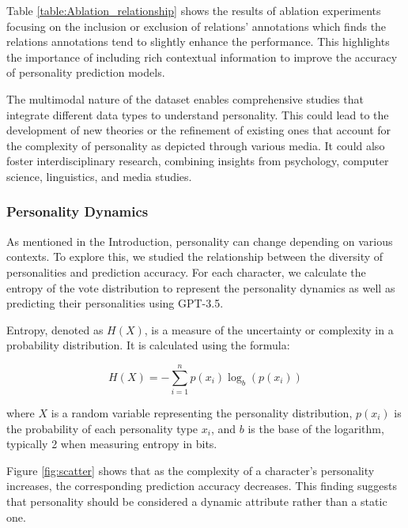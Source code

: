 Table \ref{table:Ablation_relationship} shows the results of ablation experiments focusing on the inclusion or exclusion of relations' annotations which finds the relations annotations tend to slightly enhance the performance. This highlights the importance of including rich contextual information to improve the accuracy of personality prediction models. 


The multimodal nature of the dataset enables comprehensive studies that integrate different data types to understand personality. This could lead to the development of new theories or the refinement of existing ones that account for the complexity of personality as depicted through various media. It could also foster interdisciplinary research, combining insights from psychology, computer science, linguistics, and media studies.


\subsubsection{Personality Dynamics}
As mentioned in the Introduction, personality can change depending on various contexts. To explore this, we studied the relationship between the diversity of personalities and prediction accuracy. For each character, we calculate the entropy of the vote distribution to represent the personality dynamics as well as predicting their personalities using GPT-3.5. 

Entropy, denoted as \( H(X) \), is a measure of the uncertainty or complexity in a probability distribution. It is calculated using the formula:

\[
H(X) = - \sum_{i=1}^{n} p(x_i) \log_b(p(x_i))
\]

where \( X \) is a random variable representing the personality distribution, \( p(x_i) \) is the probability of each personality type \( x_i \), and \( b \) is the base of the logarithm, typically 2 when measuring entropy in bits. 

Figure \ref{fig:scatter} shows that as the complexity of a character's personality increases, the corresponding prediction accuracy decreases. This finding suggests that personality should be considered a dynamic attribute rather than a static one.

